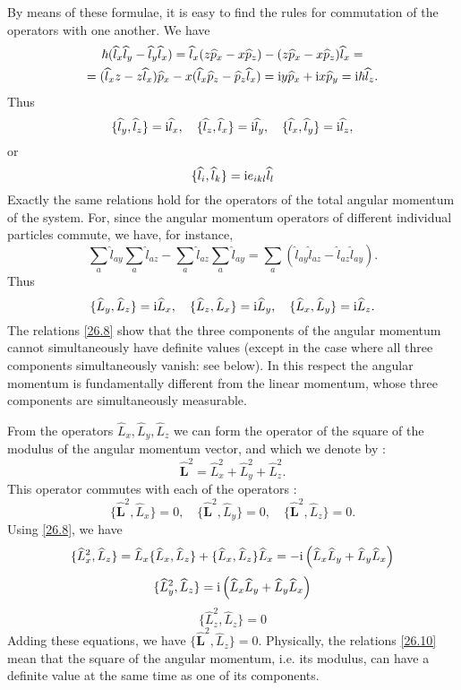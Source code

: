 By means of these formulae, it is easy to find the rules for commutation of the operators with one another. We have
\begin{multline*}
\hbar(\widehat{l}_x\widehat{l}_y-\widehat{l}_y\widehat{l}_x)=\widehat{l}_x(z\widehat{p}_x-x\widehat{p}_z)-(z\widehat{p}_x-x\widehat{p}_z)\widehat{l}_x=\\
=(\widehat{l}_xz-z\widehat{l}_x)\widehat{p}_x-x(\widehat{l}_x\widehat{p}_z-\widehat{p}_z\widehat{l}_x)=\mathrm{i} y\widehat{p}_x+\mathrm{i} x\widehat{p}_y=\mathrm{i}\hbar\widehat{l}_z.
\end{multline*}
Thus
\begin{equation}\label{26.6}
\{\widehat{l}_y,\widehat{l}_z  \}=\mathrm{i}\widehat{l}_x,\quad\{\widehat{l}_z,\widehat{l}_x  \}=\mathrm{i}\widehat{l}_y,\quad\{\widehat{l}_x,\widehat{l}_y  \}=\mathrm{i}\widehat{l}_z,
\end{equation}
or
\begin{equation}\label{26.7}
\{\widehat{l}_i,\widehat{l}_k  \}=\mathrm{i} e_{ikl}\widehat{l}_l
\end{equation}
Exactly the same relations hold for the operators of the total angular momentum of the system. For, since the angular momentum operators of different individual particles commute, we have, for instance,
\[ \sum_{a}\hat{l}_{ay}\sum_{a}\hat{l}_{az}-\sum_{a}\hat{l}_{az}\sum_{a}\hat{l}_{ay}=\sum_{a}\left(\hat{l}_{ay}\hat{l}_{az}-\hat{l}_{az}\hat{l}_{ay}  \right). \]
Thus
\begin{equation}\label{26.8}
\{\widehat{L}_y,\widehat{L}_z \}=\mathrm{i}\widehat{L}_x,\quad\{\widehat{L}_z,\widehat{L}_x \}=\mathrm{i}\widehat{L}_y,\quad\{\widehat{L}_x,\widehat{L}_y \}=\mathrm{i}\widehat{L}_z.
\end{equation}
The relations \eqref{26.8} show that the three components of the angular momentum cannot simultaneously have definite values (except in the case where all three components simultaneously vanish: see below). In this respect the angular momentum is fundamentally different from the linear momentum, whose three components are simultaneously measurable.

From the operators $ \hat{L}_x,\hat{L}_y,\hat{L}_z $ we can form the operator of the square of the modulus of the angular momentum vector, and which we denote by :
\begin{equation}\label{26.9}
\hat{\bm{L}}^2=\hat{L}_x^2+\hat{L}_y^2+\hat{L}_z^2.
\end{equation}
This operator commutes with each of the operators :
\begin{equation}\label{26.10}
\{\hat{\bm{L}}^2,\hat{L}_x \}=0,\quad\{\hat{\bm{L}}^2,\hat{L}_y \}=0,\quad\{\hat{\bm{L}}^2,\hat{L}_z \}=0.
\end{equation}
Using \eqref{26.8}, we have
\[ \{\widehat{L}_x^2,\widehat{L}_z  \}=\widehat{L}_x\{\widehat{L}_x,\widehat{L}_z \}+\{\widehat{L}_x,\widehat{L}_z \}\widehat{L}_x=-\mathrm{i}\left(\widehat{L}_x\widehat{L}_y+\widehat{L}_y\widehat{L}_x \right) \]
\[ \{\widehat{L}_y^2,\widehat{L}_z  \}=\mathrm{i}\left(\widehat{L}_x\widehat{L}_y+\widehat{L}_y\widehat{L}_x \right)  \]
\[ \{\hat{L}_z^2,\hat{L}_z \}=0 \]
Adding these equations, we have $ \{\hat{\bm{L}}^2,\hat{L}_z  \}=0 $. Physically, the relations \eqref{26.10} mean that the square of the angular momentum, i.e. its modulus, can have a definite value at the same time as one of its components.

